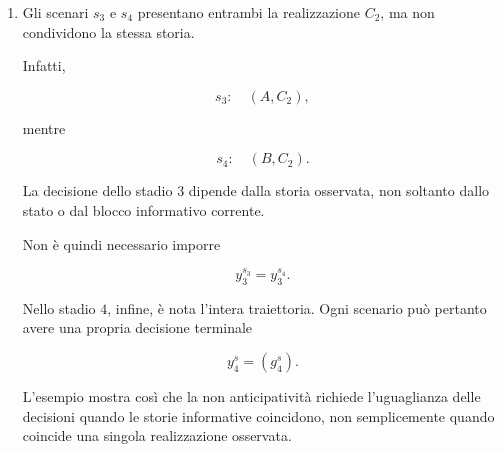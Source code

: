 \begin{enumerate}
\[
u_1^{s_1}=2,
\qquad
u_1^{s_2}=1,
\qquad
u_1^{s_3}=2.
\]

Al tempo $1$ la banca non dispone
ancora dell'informazione necessaria
per distinguere lo scenario $s_2$
dagli scenari $s_1$ e $s_3$.

Una correzione coerente con il piano
assegnato consiste quindi nel porre

\[
u_1^{s_2}=2.
\]

Per il secondo blocco di ricorso si ha invece

\[
y_3^{s_1}
=
\begin{pmatrix}
2\\
1\\
3\\
0
\end{pmatrix}
=
y_3^{s_2},
\]

per cui il vincolo di non anticipativit\`a
dello stadio $3$ \`e rispettato.

La correzione proposta garantisce
la sola coerenza informativa.
La fattibilit\`a finanziaria completa
richiederebbe anche la verifica
dei bilanci di liquidit\`a.

\item Gli scenari $s_3$ e $s_4$
presentano entrambi la realizzazione $C_2$,
ma non condividono la stessa storia.

Infatti,

\[
s_3:\quad (A,C_2),
\]

mentre

\[
s_4:\quad (B,C_2).
\]

La decisione dello stadio $3$
dipende dalla storia osservata,
non soltanto dallo stato
o dal blocco informativo corrente.

Non \`e quindi necessario imporre

\[
y_3^{s_3}=y_3^{s_4}.
\]

Nello stadio $4$, infine,
\`e nota l'intera traiettoria.
Ogni scenario pu\`o pertanto
avere una propria decisione terminale

\[
y_4^s=(g_4^s).
\]

L'esempio mostra cos\`i che
la non anticipativit\`a richiede
l'uguaglianza delle decisioni
quando le storie informative coincidono,
non semplicemente quando coincide
una singola realizzazione osservata.

\end{enumerate}


